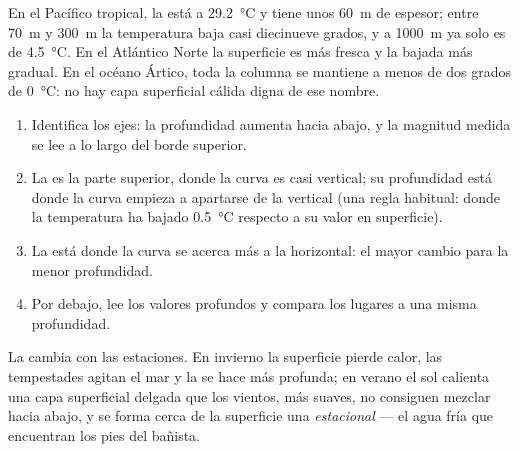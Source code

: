 En el Pacífico tropical, la  está a \qty{29.2}{\degreeCelsius}
y tiene unos \qty{60}{m} de espesor; entre \qty{70}{m} y \qty{300}{m} la
temperatura baja casi diecinueve grados, y a \qty{1000}{m} ya solo es de
\qty{4.5}{\degreeCelsius}. En el Atlántico Norte la superficie es más fresca
y la bajada más gradual. En el océano Ártico, toda la columna se mantiene a
menos de dos grados de \qty{0}{\degreeCelsius}: no hay capa superficial
cálida digna de ese nombre.

\begin{method}\label{met:g10:layered-ocean:profile}
\begin{enumerate}
  \item Identifica los ejes: la profundidad aumenta hacia abajo, y la
        magnitud medida se lee a lo largo del borde superior.
  \item La  es la parte superior, donde la curva es casi
        vertical; su profundidad está donde la curva empieza a apartarse de
        la vertical (una regla habitual: donde la temperatura ha bajado
        \qty{0.5}{\degreeCelsius} respecto a su valor en superficie).
  \item La  está donde la curva se acerca más a la horizontal: el
        mayor cambio para la menor profundidad.
  \item Por debajo, lee los valores profundos y compara los lugares a una
        misma profundidad.
\end{enumerate}
\end{method}

La  cambia con las estaciones. En invierno la superficie pierde
calor, las tempestades agitan el mar y la  se hace más
profunda; en verano el sol calienta una capa superficial delgada que los
vientos, más suaves, no consiguen mezclar hacia abajo, y se forma cerca de la
superficie una \emph{ estacional} --- el agua fría que encuentran
los pies del bañista.

